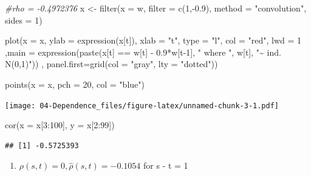 \documentclass[
]{book}
\newenvironment{Shaded}{\begin{snugshade}}{\end{snugshade}}
\newcommand{\AttributeTok}[1]{\textcolor[rgb]{0.77,0.63,0.00}{#1}}
\newcommand{\CommentTok}[1]{\textcolor[rgb]{0.56,0.35,0.01}{\textit{#1}}}
\newcommand{\DecValTok}[1]{\textcolor[rgb]{0.00,0.00,0.81}{#1}}
\newcommand{\FloatTok}[1]{\textcolor[rgb]{0.00,0.00,0.81}{#1}}
\newcommand{\FunctionTok}[1]{\textcolor[rgb]{0.00,0.00,0.00}{#1}}
\newcommand{\NormalTok}[1]{#1}
\newcommand{\OtherTok}[1]{\textcolor[rgb]{0.56,0.35,0.01}{#1}}
\newcommand{\SpecialCharTok}[1]{\textcolor[rgb]{0.00,0.00,0.00}{#1}}
\newcommand{\StringTok}[1]{\textcolor[rgb]{0.31,0.60,0.02}{#1}}
\providecommand{\tightlist}{%
  \setlength{\itemsep}{0pt}\setlength{\parskip}{0pt}}
\theoremstyle{definition}
\theoremstyle{definition}
\theoremstyle{definition}
\theoremstyle{definition}
\theoremstyle{remark}
\begin{document}
\begin{Shaded}
\begin{Highlighting}[]
\CommentTok{\#rho = {-}0.4972376}
\NormalTok{x }\OtherTok{\textless{}{-}} \FunctionTok{filter}\NormalTok{(}\AttributeTok{x =}\NormalTok{ w, }\AttributeTok{filter =} \FunctionTok{c}\NormalTok{(}\DecValTok{1}\NormalTok{,}\SpecialCharTok{{-}}\FloatTok{0.9}\NormalTok{), }\AttributeTok{method =} \StringTok{"convolution"}\NormalTok{, }\AttributeTok{sides =} \DecValTok{1}\NormalTok{)}

\FunctionTok{plot}\NormalTok{(}\AttributeTok{x =}\NormalTok{ x, }\AttributeTok{ylab =} \FunctionTok{expression}\NormalTok{(x[t]), }\AttributeTok{xlab =} \StringTok{"t"}\NormalTok{, }\AttributeTok{type =} \StringTok{"l"}\NormalTok{, }\AttributeTok{col =} \StringTok{"red"}\NormalTok{, }\AttributeTok{lwd =} \DecValTok{1}\NormalTok{ ,}\AttributeTok{main =} \FunctionTok{expression}\NormalTok{(}\FunctionTok{paste}\NormalTok{(x[t] }\SpecialCharTok{==}\NormalTok{ w[t] }\SpecialCharTok{{-}} \FloatTok{0.9}\SpecialCharTok{*}\NormalTok{w[t}\DecValTok{{-}1}\NormalTok{], }\StringTok{" where "}\NormalTok{, w[t], }\StringTok{"\textasciitilde{} ind. N(0,1)"}\NormalTok{)) , }\AttributeTok{panel.first=}\FunctionTok{grid}\NormalTok{(}\AttributeTok{col =} \StringTok{"gray"}\NormalTok{, }\AttributeTok{lty =} \StringTok{"dotted"}\NormalTok{))}
  
\FunctionTok{points}\NormalTok{(}\AttributeTok{x =}\NormalTok{ x, }\AttributeTok{pch =} \DecValTok{20}\NormalTok{, }\AttributeTok{col =} \StringTok{"blue"}\NormalTok{)}
\end{Highlighting}
\end{Shaded}

\texttt{[image: 04-Dependence\_files/figure-latex/unnamed-chunk-3-1.pdf]}

\begin{Shaded}
\begin{Highlighting}[]
\FunctionTok{cor}\NormalTok{(}\AttributeTok{x =}\NormalTok{ x[}\DecValTok{3}\SpecialCharTok{:}\DecValTok{100}\NormalTok{], }\AttributeTok{y =}\NormalTok{ x[}\DecValTok{2}\SpecialCharTok{:}\DecValTok{99}\NormalTok{]) }
\end{Highlighting}
\end{Shaded}

\begin{verbatim}
## [1] -0.5725393
\end{verbatim}

\begin{enumerate}
\def\labelenumi{\arabic{enumi}.}
\setcounter{enumi}{2}
\tightlist
\item
  \(\rho(s,t)=0, \hat{\rho}(s,t)=-0.1054\) for \textbar s - t\textbar{} = 1
\end{enumerate}
\end{document}
